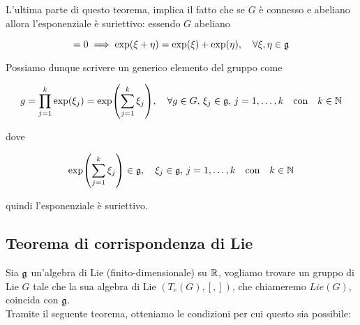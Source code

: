 \begin{remark}
	L'ultima parte di questo teorema, implica il fatto che se $ G $ è connesso e abeliano allora l'esponenziale è suriettivo: essendo $ G $ abeliano
	
	\begin{equation}
		[\xi,\eta] = 0 \implies \exp(\xi + \eta) = \exp(\xi) + \exp(\eta) \qcomma \forall \xi,\eta \in \g
	\end{equation}

	Possiamo dunque scrivere un generico elemento del gruppo come
	
	\begin{equation}
		g = \prod_{j=1}^{k} \exp(\xi_{j}) = \exp( \sum_{j=1}^{k} \xi_{j} ) \qcomma \forall g \in G, \, \xi_{j} \in \g, \, j=1,\dots,k \qq{con} k \in \N
	\end{equation}

	dove
	
	\begin{equation}
		\exp( \sum_{j=1}^{k} \xi_{j} ) \in \g \qcomma \xi_{j} \in \g, \, j=1,\dots,k \qq{con} k \in \N
	\end{equation}
	
	quindi l'esponenziale è suriettivo.
\end{remark}

\subsection{Teorema di corrispondenza di Lie}

Sia $ \mathfrak{g} $ un'algebra di Lie (finito-dimensionale) su $ \mathbb{R} $, vogliamo trovare un gruppo di Lie $ G $ tale che la sua algebra di Lie $ (T_{e}(G),[,]) $, che chiameremo $ Lie(G) $, coincida con $ \mathfrak{g} $.\\
Tramite il seguente teorema, otteniamo le condizioni per cui questo sia possibile:

